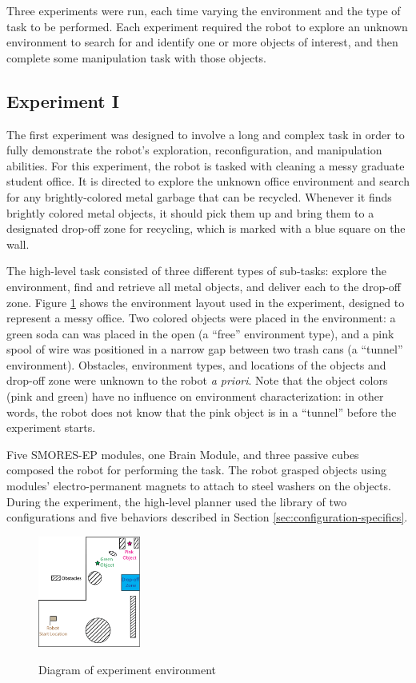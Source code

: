 \documentclass[conference]{IEEEtran}
\begin{document}
Three experiments were run, each time varying the environment and the type of task to be performed. Each experiment required the robot to explore an unknown environment to search for and identify one or more objects of interest, and then complete some manipulation task with those objects.

\subsection{Experiment I}

The first experiment was designed to involve a long and complex task in order to fully demonstrate the robot's exploration, reconfiguration, and manipulation abilities. For this experiment, the robot is tasked with cleaning a messy graduate student office.  It is directed to explore the unknown office environment and search for any brightly-colored metal garbage that can be recycled.  Whenever it finds brightly colored metal objects, it should pick them up and bring them to a designated drop-off zone for recycling, which is marked with a blue square on the wall.

The high-level task consisted of three different types of sub-tasks: explore the environment, find and retrieve all metal objects, and deliver each to the drop-off zone. Figure \ref{fig:map} shows the environment layout used in the experiment, designed to represent a messy office. Two colored objects were placed in the environment: a green soda can was placed in the open (a ``free'' environment type), and a pink spool of wire was positioned in a narrow gap between two trash cans (a ``tunnel'' environment). Obstacles, environment types, and locations of the objects and drop-off zone were unknown to the robot \textit{a priori}.  Note that the object colors (pink and green) have no influence on environment characterization: in other words, the robot does not know that the pink object is in a ``tunnel''  before the experiment starts.

Five SMORES-EP modules, one Brain Module, and three passive cubes composed the robot for performing the task. The robot grasped objects using modules' electro-permanent magnets to attach to steel washers on the objects.
During the experiment, the high-level planner used the library of two configurations and five behaviors described in Section \ref{sec:configuration-specifics}.

\begin{figure}
\begin{center}
\includegraphics[width=0.3\textwidth]{images/RSSMap.png}
\caption{Diagram of experiment environment}
\vspace{-2em}
\label{fig:map}
\end{center}
\end{figure}
\end{document}
